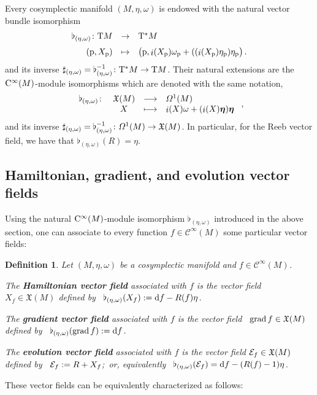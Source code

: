 \documentclass[12pt]{report}
\newtheorem{definition}[teor]{Definition}
\def\vf{\mathfrak X}
\def\df{{\mit\Omega}}
\def\d{{\rm d}}
\def\bmeta{\mbox{\boldmath $\eta$}}
\def\Tan{{\rm T}}
\def\inn{\mathop{i}\nolimits}
\def\Cinfty{{\rm C}^\infty}
\begin{document}
Every cosymplectic manifold $(M,\eta,\omega)$ is endowed with
the natural vector bundle isomorphism
$$
\begin{array}{rcl}
\flat_{(\eta,\omega)}\colon \Tan M & \to & \Tan^*M\\ \noalign{\medskip}
({\rm p},X_{\rm p}) & \mapsto & 
\big({\rm p},\inn(X_{\rm p})\omega_{\rm p} + ((\inn(X_{\rm p})\eta_{\rm p})\eta_{\rm p}\big)\,.
\end{array}
$$
and its inverse $\sharp_{(\eta,\omega)}=\flat_{(\eta,\omega)}^{-1}\colon \Tan^*M \to \Tan M$.
Their natural extensions are the $\Cinfty(M)$-module isomorphisms
which are denoted with the same notation,
$$
\begin{array}{rccl}
   \flat_{(\eta,\omega)}\colon & \vf(M) & \longrightarrow & \df^1(M) \\
   & X & \longmapsto & \inn(X)\omega+(\inn(X)\bmeta)\bmeta
\end{array} \ ,
$$
and its inverse $\sharp_{(\eta,\omega)}=\flat_{(\eta,\omega)}^{-1}\colon \df^1(M)\to \vf(M)$.
In particular, for the Reeb vector field, we have that
$\flat_{(\eta,\omega)}(R)=\eta$.


\subsection{Hamiltonian, gradient, and evolution vector fields}


Using the natural $\Cinfty(M)$-module isomorphism $\flat_{(\eta,\omega)}$
introduced in the above section,
one can associate to every function $f\in\mathcal{C}^\infty(M)$
some particular vector fields:

\begin{definition}
\label{GradHamEvol}
Let $(M,\eta,\omega)$ be a cosymplectic manifold and $f\in\mathcal{C}^\infty(M)$.

The \textbf{Hamiltonian vector field} associated with $f$
is the vector field \ $X_f\in\vf(M)$ defined by
\ $\flat_{(\eta,\omega)}(X_f):=\d f-R(f)\eta$.

 The \textbf{gradient vector field} associated with $f$
is the vector field \ ${\rm grad}\,f\in\vf(M)$ defined by
\ $\flat_{(\eta,\omega)}({\rm grad}\, f):=\d f$.

The \textbf{evolution vector field}  associated with $f$
is the vector field ${\cal E}_f\in\vf(M)$ defined by
\ ${\cal E}_f:=R+ X_f$;\ or, equivalently
\ $\flat_{(\eta,\omega)}({\cal E}_f)=\d f-(R(f)-1)\eta$.
\end{definition}

These vector fields can be equivalently characterized as follows:
\end{document}
